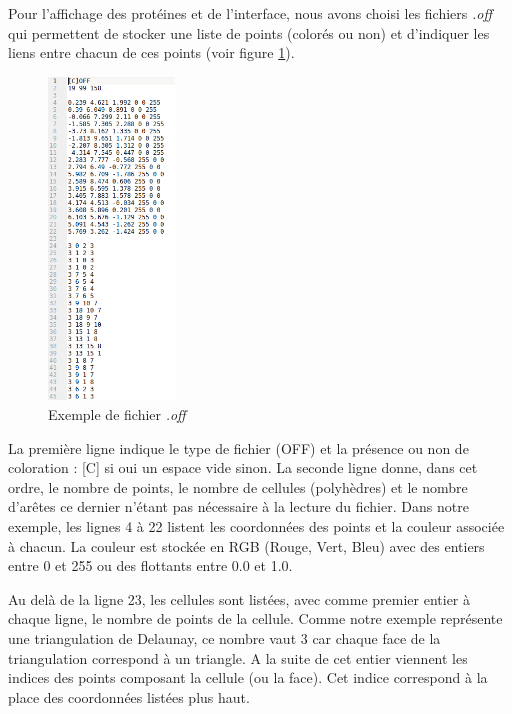 Pour l'affichage des protéines et de l'interface, nous avons choisi les fichiers
\textit{.off} qui permettent de stocker une liste de points (colorés ou non) et
d'indiquer les liens entre chacun de ces points (voir figure \ref{fig::off_file}).

\begin{figure}[ht]
\centering
  \includegraphics[width=0.3\textwidth]{figures/off_file.png}
  \caption{Exemple de fichier \textit{.off}}
  \label{fig::off_file}
\end{figure}

La première ligne indique le type de fichier (OFF) et la présence ou non de coloration :
[C] si oui un espace vide sinon. La seconde ligne donne, dans cet ordre, le nombre
de points, le nombre de cellules (polyhèdres) et le nombre d'arêtes ce dernier n'étant
pas nécessaire à la lecture du fichier. Dans notre exemple, les lignes 4 à 22 listent
les coordonnées des points et la couleur associée à chacun. La couleur est stockée en RGB
(Rouge, Vert, Bleu) avec des entiers entre 0 et 255 ou des flottants entre 0.0 et 1.0.

Au delà de la ligne 23, les cellules sont listées, avec comme premier entier à chaque
ligne, le nombre de points de la cellule. Comme notre exemple représente une triangulation
de Delaunay, ce nombre vaut 3 car chaque face de la triangulation correspond à un
triangle. A la suite de cet entier viennent les indices des points composant la cellule
(ou la face). Cet indice correspond à la place des coordonnées listées plus haut.
